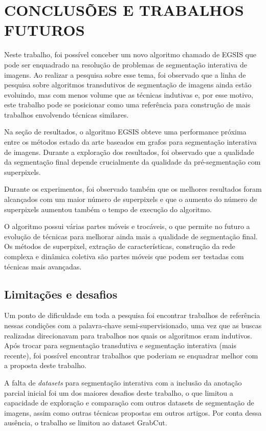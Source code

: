 \chapter{CONCLUSÕES E TRABALHOS FUTUROS}\label{chap:conclusoes-e-trabalhos-futuros}

Neste trabalho, foi possível conceber um novo algoritmo chamado de
\gls{EGSIS} que pode ser enquadrado na resolução de problemas de
segmentação interativa de imagens. Ao realizar a pesquisa sobre esse
tema, foi observado que a linha de pesquisa sobre algoritmos
transdutivos de segmentação de imagens ainda estão evoluindo, mas com
menos volume que as técnicas indutivas e, por esse motivo, este
trabalho pode se posicionar como uma referência para construção de
mais trabalhos envolvendo técnicas similares.

Na seção de resultados, o algoritmo \gls{EGSIS} obteve uma performance
próxima entre os métodos estado da arte baseados em grafos para
segmentação interativa de imagens. Durante a exploração dos
resultados, foi observado que a qualidade da segmentação final depende
crucialmente da qualidade da pré-segmentação com superpixels.

Durante os experimentos, foi observado também que os melhores
resultados foram alcançados com um maior número de superpixels e que
o aumento do número de superpixels aumentou também o tempo de
execução do algoritmo.

O algoritmo possui várias partes móveis e trocáveis, o que permite no
futuro a evolução de técnicas para melhorar ainda mais a qualidade de
segmentação final. Os métodos de superpixel, extração de
características, construção da rede complexa e dinâmica coletiva são
partes móveis que podem ser testadas com técnicas mais avançadas.

\section{Limitações e desafios}\label{sec:limitacoes-desafios}

Um ponto de dificuldade em toda a pesquisa foi encontrar trabalhos de
referência nessas condições com a palavra-chave semi-supervisionado,
uma vez que as buscas realizadas direcionavam para trabalhos nos quais
os algoritmos eram indutivos. Após trocar para segmentação transdutiva
e segmentação interativa (mais recente), foi possível encontrar
trabalhos que poderiam se enquadrar melhor com a proposta deste trabalho.

A falta de \textit{datasets} para segmentação interativa com a
inclusão da anotação parcial inicial foi um dos maiores desafios
deste trabalho, o que limitou a capacidade de exploração e comparação
com outros datasets de segmentação de imagens, assim como outras
técnicas propostas em outros artigos. Por conta dessa ausência, o
trabalho se limitou ao dataset GrabCut.

